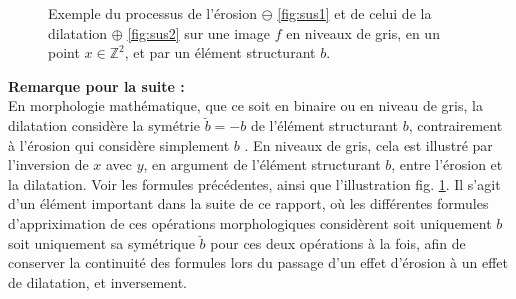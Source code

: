 \newpage

\vspace{2.0mm}
\begin{figure}[ht]
  \begin{center}
      \hfill
    \caption{ \centering Exemple du processus de l'érosion $\ominus$ \ref{fig:sus1} et de celui de la dilatation $\oplus$ \ref{fig:sus2} sur une image $f$ en niveaux de gris, en un point $x \in \mathbb{Z}^2$, et par un élément structurant $b$.}
    \label{fig:morpho_grey_operations_example}
  \end{center}
\end{figure}

\vspace{1.0mm}
\noindent \textbf{Remarque pour la suite :} \\

\vspace{-0.6mm}
En morphologie mathématique, que ce soit en binaire ou en niveau de gris, la dilatation considère la symétrie $\breve{b}=-b$ de l'élément structurant $b$, contrairement à l'érosion qui considère simplement $b$ \cite{Haralick_1987}. En niveaux de gris, cela est illustré par l'inversion de $x$ avec $y$, en argument de l'élément structurant $b$, entre l'érosion et la dilatation. Voir les formules précédentes, ainsi que l'illustration fig. \ref{fig:morpho_grey_operations_example}. Il s'agit d'un élément important dans la suite de ce rapport, où les différentes formules d'appriximation de ces opérations morphologiques considèrent soit uniquement $b$ soit uniquement sa symétrique $\breve{b}$ pour ces deux opérations à la fois, afin de conserver la continuité des formules lors du passage d'un effet d'érosion à un effet de dilatation, et inversement. \\

